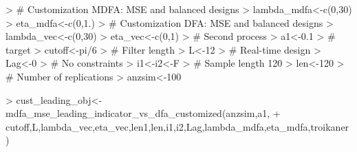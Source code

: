 \documentclass[a4paper]{book}
\begin{document}
\begin{Schunk}
\begin{Sinput}
> # Customization MDFA: MSE and balanced designs
> lambda_mdfa<-c(0,30)
> eta_mdfa<-c(0,1.)
> # Customization DFA: MSE and balanced designs
> lambda_vec<-c(0,30)
> eta_vec<-c(0,1)
> # Second process
> a1<-0.1
> # target
> cutoff<-pi/6
> # Filter length
> L<-12
> # Real-time design
> Lag<-0
> # No constraints
> i1<-i2<-F
> # Sample length 120
> len<-120
> # Number of replications
> anzsim<-100
\end{Sinput}
\end{Schunk}
\begin{Schunk}
\begin{Sinput}
> cust_leading_obj<-mdfa_mse_leading_indicator_vs_dfa_customized(anzsim,a1,
+     cutoff,L,lambda_vec,eta_vec,len1,len,i1,i2,Lag,lambda_mdfa,eta_mdfa,troikaner)  
\end{Sinput}
\end{Schunk}
\end{document}
